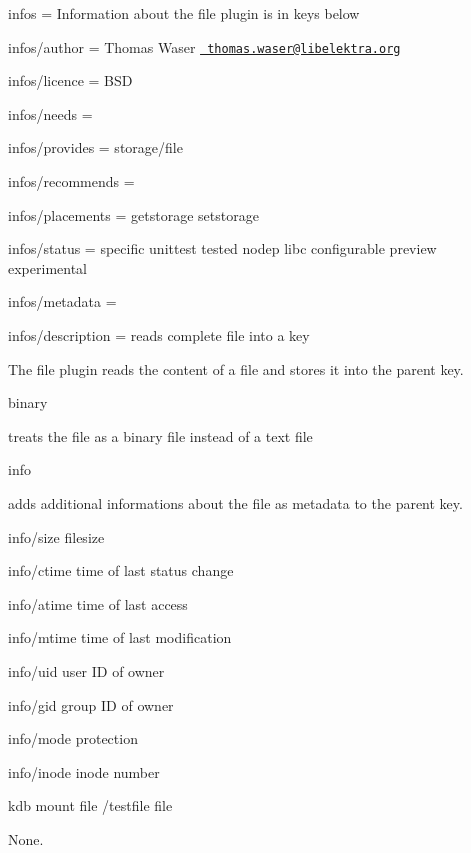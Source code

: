 
\begin{DoxyItemize}
\item infos = Information about the file plugin is in keys below
\item infos/author = Thomas Waser \href{mailto:thomas.waser@libelektra.org}{\texttt{ thomas.\+waser@libelektra.\+org}}
\item infos/licence = B\+SD
\item infos/needs =
\item infos/provides = storage/file
\item infos/recommends =
\item infos/placements = getstorage setstorage
\item infos/status = specific unittest tested nodep libc configurable preview experimental
\item infos/metadata =
\item infos/description = reads complete file into a key
\end{DoxyItemize}

The file plugin reads the content of a file and stores it into the parent key.


\begin{DoxyItemize}
\item {\ttfamily binary}

treats the file as a binary file instead of a text file
\item {\ttfamily info}

adds additional informations about the file as metadata to the parent key.
\begin{DoxyItemize}
\item {\ttfamily info/size} filesize
\item {\ttfamily info/ctime} time of last status change
\item {\ttfamily info/atime} time of last access
\item {\ttfamily info/mtime} time of last modification
\item {\ttfamily info/uid} user ID of owner
\item {\ttfamily info/gid} group ID of owner
\item {\ttfamily info/mode} protection
\item {\ttfamily info/inode} inode number
\end{DoxyItemize}
\end{DoxyItemize}

{\ttfamily kdb mount file /testfile file}

None.

